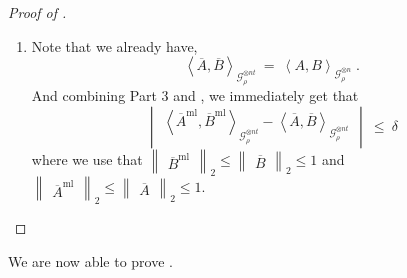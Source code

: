 \documentclass[11pt]{article}
\newcommand{\inbrace}[1]{\left \{ #1 \right \}}
\newcommand{\inparen}[1]{\left ( #1 \right )}
\newcommand{\inangle}[1]{\left \langle #1 \right \rangle}
\newcommand{\inabs}[1]{\begin{vmatrix} #1 \end{vmatrix}}
\newcommand{\norm}[2]{\begin{Vmatrix} #2 \end{Vmatrix}_{#1}}
\newcommand{\set}[1]{\inbrace{#1}}
\newcommand{\setdef}[2]{\set{#1 : #2}}
\DeclareMathOperator*{\Ex}{\mathbb{E}}
\DeclareMathOperator*{\Var}{\mathsf{Var}}
\newcommand{\bX}{\mathbf{X}}
\newcommand{\calG}{\mathcal{G}}
\newcommand{\Inf}{\mathrm{Inf}}
\newcommand{\ml}{\mathrm{ml}}
\begin{document}
\begin{proof}[Proof of ]
\begin{enumerate}
		In the more general case $n$-variate case, we observe that,
		\begin{align*}
		\Inf_{X^{(i)}_j}\inparen{\overline{A}^{\ml}} &~=~ \Ex_{\overline{\bX} \setminus \set{X^{(i)}_j}} \ \Var_{X^{(i)}_j} \inparen{\overline{A}^{\ml}_{\overline{X} \setminus \set{X^{(i)}_j}} \inparen{X^{(i)}_j}}\\
		&~=~ \Ex_{\bX^{(-i)}} \Ex_{\bX^{(i)}_{-j}} \Var_{X^{(i)}_j} \inparen{\overline{A}^{\ml}_{\overline{X} \setminus \set{X^{(i)}_j}} \inparen{X^{(i)}_j}} && \text{(for simplicity, $\bX^{(-i)} := \overline{\bX} \setminus \setdef{X^{(i)}_j}{j \in [t]}$)}\\
		&~=~ \Ex_{\bX^{(-i)}} \Inf_{X^{(i)}_j} \inparen{\overline{A}^{\ml}_{X^{(-i)}}(X^{(i)})}\\
		&~=~ \Ex_{\bX^{(-i)}} \Var\inparen{\overline{A}^{\ml}_{X^{(-i)}}} \cdot (d/t)\\
		&~\le~ (d/t) \cdot \Inf_i(A)\\
		&~\le~ d/t\\
		&~<~ \delta.
		\end{align*}
		where, in last two inequalities, we use that $\Inf_i(A) \le \Var(A) \le 1$ and that $t = \Theta(d^2/\delta^2)$.
		
		\item Note that we already have,
		\[ \inangle{\overline{A}, \overline{B}}_{\calG_\rho^{\otimes nt}} \ = \ \inangle{A, B}_{\calG_\rho^{\otimes n}}\;. \]
		And combining Part 3 and , we immediately get that
		\[\inabs{\inangle{\overline{A}^{\mathrm{ml}}, \overline{B}^{\mathrm{ml}}}_{\calG_\rho^{\otimes nt}} - \inangle{\overline{A}, \overline{B}}_{\calG_\rho^{\otimes nt}}} ~\le~ \delta\] %
		where we use that $\norm{2}{\overline{B}^{\ml}} \le \norm{2}{\overline{B}} \le 1$ and $\norm{2}{\overline{A}^{\ml}} \le \norm{2}{\overline{A}} \le 1$.
	\end{enumerate}
\end{proof}

\noindent We are now able to prove .
\end{document}
